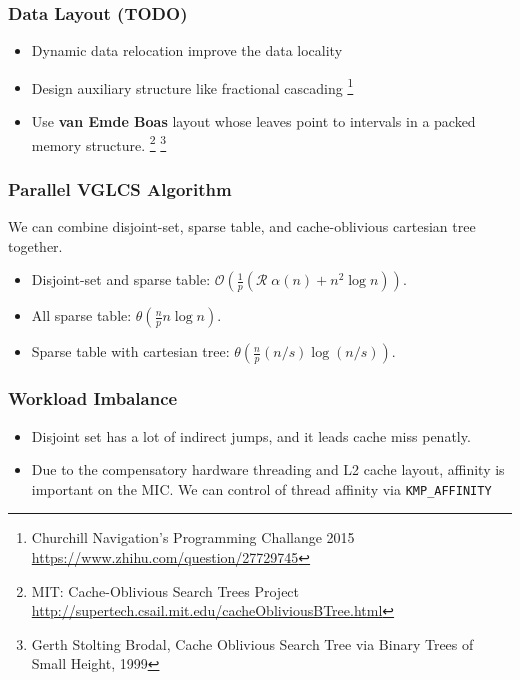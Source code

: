 \begin{frame}
	\frametitle{Data Layout (TODO)}
	\begin{itemize}
		\setlength\itemsep{1em}
		\item Dynamic data relocation improve the data locality
		\item Design auxiliary structure like fractional cascading
		\footnote{Churchill Navigation's Programming Challange 2015 \url{https://www.zhihu.com/question/27729745}}
		\item Use \textbf{van Emde Boas} layout whose leaves point to intervals in a packed memory structure.
		\footnote{MIT: Cache-Oblivious Search Trees Project \url{http://supertech.csail.mit.edu/cacheObliviousBTree.html}}
		\footnote{Gerth Stolting Brodal, Cache Oblivious Search Tree via Binary Trees of Small Height, 1999}
	\end{itemize}
\end{frame}

\begin{frame}
	\frametitle{Parallel VGLCS Algorithm}
	We can combine disjoint-set, sparse table, and cache-oblivious cartesian tree together.
	\begin{itemize}
		\setlength\itemsep{1em}
		\item Disjoint-set and sparse table: $\mathcal{O}(\frac{1}{p}(\mathcal{R} \; \alpha(n) + n^2 \log n))$.
		\item All sparse table: $\mathcal{\theta}(\frac{n}{p} n \log n)$.
		\item Sparse table with cartesian tree: $\mathcal{\theta}(\frac{n}{p} (n/s) \log (n/s))$.
	\end{itemize}
\end{frame}

\begin{frame}
	\frametitle{Workload Imbalance}
	\begin{itemize}
		\setlength\itemsep{1em}
		\item Disjoint set has a lot of indirect jumps, and it leads cache miss penatly.
		\item Due to the compensatory hardware threading and L2 cache layout, affinity 
			is important on the MIC. We can control of thread affinity via \tt{KMP\_AFFINITY}
	\end{itemize}
\end{frame}

